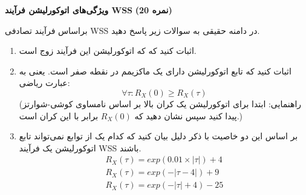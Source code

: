 \Large \textbf{ویژگی‌های اتوکورلیشن فرآیند WSS}
\large \textbf{(20 نمره)}

\normalsize \vspace{0.5cm}
براساس فرآیند تصادفی WSS در دامنه حقیقی به سوالات زیر پاسخ دهید.
\begin{enumerate}[label=(\alph*)]
	\item
اثبات کنید که که اتوکورلیشن این فرآیند زوج است.
	\item
اثبات کنید که تابع اتوکورلیشن دارای یک ماکزیمم در نقطه صفر است. یعنی به عبارت ریاضی:
$$
\forall \tau : R_{X}(0) \geqslant R_X(\tau)
$$
(راهنمایی: ابتدا برای اتوکورلیشن یک کران بالا بر اساس نامساوی کوشی-شوارتز پیدا کنید سپس نشان دهید که 
$ R_X(0) $
برابر با این کران است.)
	\item 
بر اساس این دو خاصیت با ذکر دلیل بیان کنید که کدام یک از توابع نمی‌تواند تابع اتوکورلیشن یک فرآیند WSS باشند.
$$
\begin{array}{l}
	{R_X}(\tau ) = exp(0.01 \times |\tau |) + 4\\
	{R_X}(\tau ) = exp( - |\tau  - 4|) + 9\\
	{R_X}(\tau ) = exp( - |\tau | + 4) - 25
\end{array}
$$

\end{enumerate}


